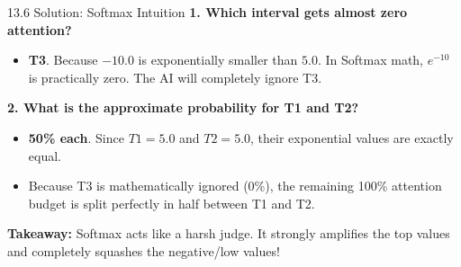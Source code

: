 \documentclass[aspectratio=169]{beamer}
\begin{document}
\begin{frame}{13.6 Solution: Softmax Intuition}
  \textbf{1. Which interval gets almost zero attention?}
  \begin{itemize}
      \item \textbf{T3}. Because $-10.0$ is exponentially smaller than $5.0$. In Softmax math, $e^{-10}$ is practically zero. The AI will completely ignore T3.
  \end{itemize}
  
  \vspace{0.3cm}
  \textbf{2. What is the approximate probability for T1 and T2?}
  \begin{itemize}
      \item \textbf{50\% each}. Since $T1 = 5.0$ and $T2 = 5.0$, their exponential values are exactly equal. 
      \item Because T3 is mathematically ignored (0\%), the remaining 100\% attention budget is split perfectly in half between T1 and T2.
  \end{itemize}
  
  \vspace{0.3cm}
  \textbf{Takeaway:} Softmax acts like a harsh judge. It strongly amplifies the top values and completely squashes the negative/low values!
\end{frame}
\end{document}
